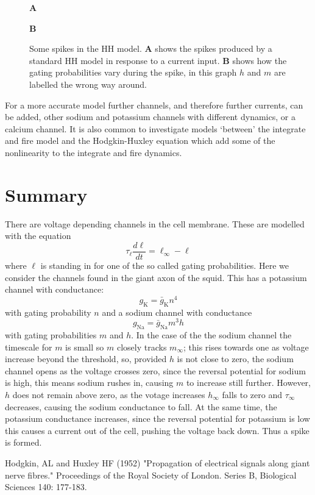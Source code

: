 \documentclass[12pt]{article}
\begin{document}
\begin{figure}
    {
  \textbf{A}
\begin{center}

\end{center}
\textbf{B}
\begin{center}

\end{center}
}
\caption{Some spikes in the HH model. \textbf{A} shows the spikes produced by a standard HH model in response to a current input. \textbf{B} shows how the gating probabilities vary during the spike, in this graph $h$ and $m$ are labelled the wrong way around.\label{fig:HH_spike}}
\end{figure}

For a more accurate model further channels, and therefore further
currents, can be added, other sodium and potassium channels with
different dynamics, or a calcium channel. It is also common to
investigate models \lq{}between\rq{} the integrate and fire model and
the Hodgkin-Huxley equation which add some of the nonlinearity to the
integrate and fire dynamics.

\section*{Summary}

There are voltage depending channels in the cell membrane. These are modelled with the equation
\begin{equation}
  \tau_\ell\frac{d\ell}{dt}=\ell_\infty-\ell
\end{equation}
where $\ell$ is standing in for one of the so called gating probabilities. Here we consider the channels found in the giant axon of the squid. This has a potassium channel with conductance:
\begin{equation}
  g_{\text{K}}=\bar{g}_{\text{K}}n^4
\end{equation}
with gating probability $n$ and a sodium channel with conductance
\begin{equation}
  g_{\text{Na}}=\bar{g}_{\text{Na}}m^3h
\end{equation}
with gating probabilities $m$ and $h$. In the case of the the sodium
channel the timescale for $m$ is small so $m$ closely tracks
$m_\infty$; this rises towards one as voltage increase beyond the
threshold, so, provided $h$ is not close to zero, the sodium channel
opens as the voltage crosses zero, since the reversal potential for
sodium is high, this means sodium rushes in, causing $m$ to increase
still further. However, $h$ does not remain above zero, as the votage
increases $h_\infty$ falls to zero and $\tau_\infty$ decreases,
causing the sodium conductance to fall. At the same time, the
potassium conductance increases, since the reversal potential for
potassium is low this causes a current out of the cell, pushing the
voltage back down. Thus a spike is formed.


\begin{thebibliography}{99}
Hodgkin, AL and Huxley HF (1952) 
\newblock"Propagation of electrical signals along giant nerve fibres." 
\newblock Proceedings of the Royal Society of London. Series B, Biological Sciences 140: 177-183.
\end{thebibliography}
\end{document}
